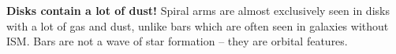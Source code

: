 \documentclass[letterpaper,landscape]{slides}
\begin{document}








\begin{slide}

\begin{center}
\end{center}

{\bf \color{blue}  Disks contain a lot of dust!} Spiral arms are almost exclusively
seen in disks with a lot of gas and dust, unlike bars which are often seen
in galaxies without ISM. {\color{blue} Bars are not a wave of star formation -- they are
orbital features.}
 
\vfill
\end{slide}

\end{document}
